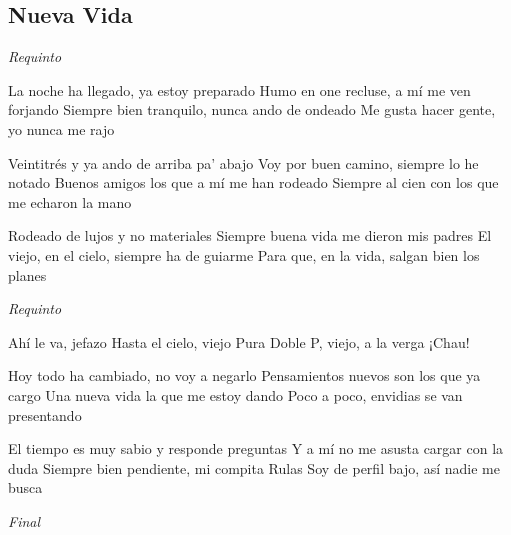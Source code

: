 \subsection{Nueva Vida}
\noindent

\vspace{1cm}

\begin{guitar}
	\begin{multicols}{2}
		\textit{Requinto}
		\par

		La noche ha llegado, ya estoy preparado
		Humo en one recluse, a mí me ven forjando
		Siempre bien tranquilo, nunca ando de ondeado
		Me gusta hacer gente, yo nunca me rajo

		Veintitrés y ya ando de arriba pa' abajo
		Voy por buen camino, siempre lo he notado
		Buenos amigos los que a mí me han rodeado
		Siempre al cien con los que me echaron la mano

		Rodeado de lujos y no materiales
		Siempre buena vida me dieron mis padres
		El viejo, en el cielo, siempre ha de guiarme
		Para que, en la vida, salgan bien los planes

		\par
		\textit{Requinto}
		\par

		Ahí le va, jefazo
		Hasta el cielo, viejo
		Pura Doble P, viejo, a la verga
		¡Chau!

		Hoy todo ha cambiado, no voy a negarlo
		Pensamientos nuevos son los que ya cargo
		Una nueva vida la que me estoy dando
		Poco a poco, envidias se van presentando

		El tiempo es muy sabio y responde preguntas
		Y a mí no me asusta cargar con la duda
		Siempre bien pendiente, mi compita Rulas
		Soy de perfil bajo, así nadie me busca
		\par
		\textit{Final}

	\end{multicols}
\end{guitar}
